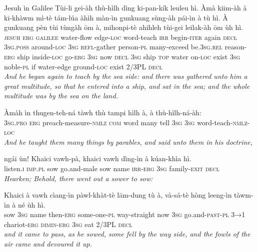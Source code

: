 \documentclass[11pt,a4paper]{article}
\begin{document}
\begin{exe}
\gll Jesuh ìn Galilee Tùi-li gei-àh thù-hìlh dìng ki-pan-kík leuleu hì. Àmà kiim-àh à kī-khàwm mì-tè tám-lúa àhìh màn-ìn gunkuang sùng-àh pái-ìn à tù hì. À gunkuang pèn tùi tùngàh ōm à, mihonpi-tè ahihleh tùi-gei leilak-àh ōm ùh hì. \\
     \textsc{jesuh} \textsc{erg} \textsc{galilee} water-flow edge-\textsc{loc} word-teach \textsc{irr} begin-\textsc{iter} again \textsc{decl} \textsc{3sg}.\textsc{poss} around-\textsc{loc} \textsc{3sg} \textsc{refl}-gather person-\textsc{pl} many-exceed be.\textsc{3sg}.\textsc{rel} reason-\textsc{erg} ship inside-\textsc{loc} go-\textsc{erg} \textsc{3sg} now \textsc{decl} \textsc{3sg} ship \textsc{top} water on-\textsc{loc} exist \textsc{3sg} noble-\textsc{pl} if water-edge ground-\textsc{loc} exist 2/3PL \textsc{decl} \\
\glt \textcolor{kjvcolor}{\textit{And he began again to teach by the sea side: and there was gathered unto him a great multitude, so that he entered into a ship, and sat in the sea; and the whole multitude was by the sea on the land.}}

\gll Àmàh ìn thugen-teh-ná tàwh thù tampi hìlh à, à thù-hìlh-ná-àh: \\
     \textsc{3sg}.\textsc{pro} \textsc{erg} preach-measure-\textsc{nmlz} \textsc{com} word many tell \textsc{3sg} \textsc{3sg} word-teach-\textsc{nmlz}-\textsc{loc} \\
\glt \textcolor{kjvcolor}{\textit{And he taught them many things by parables, and said unto them in his doctrine,}}

\gll ngái ùn! Khaici vawh-pà, khaici vawh dìng-ìn à kúan-khìa hì. \\
     listen.\textsc{i} \textsc{imp}.\textsc{pl} sow go.and-male sow name \textsc{irr}-\textsc{erg} \textsc{3sg} family-\textsc{exit} \textsc{decl} \\
\glt \textcolor{kjvcolor}{\textit{Hearken; Behold, there went out a sower to sow:}}

\gll Khaici à vawh cìang-ìn pàwl-khàt-tè lām-dung tù à, và-sá-tè hòng leeng-ìn tàwm-ìn à né ùh hì. \\
     sow \textsc{3sg} name then-\textsc{erg} some-one-\textsc{pl} way-straight now \textsc{3sg} go.and-\textsc{past}-\textsc{pl} \textsc{3→1} chariot-\textsc{erg} \textsc{dimin}-\textsc{erg} \textsc{3sg} eat 2/3PL \textsc{decl} \\
\glt \textcolor{kjvcolor}{\textit{and it came to pass, as he sowed, some fell by the way side, and the fowls of the air came and devoured it up.}}


\end{exe}
\end{document}
